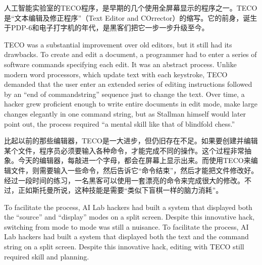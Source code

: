 \ifdefined\chs
人工智能实验室的TECO程序，是早期的几个使用全屏幕显示的程序之一。TECO是``文本编辑及修正程序''（Text Editor and COrrector）的缩写。它的前身，诞生于PDP-6和电子打字机的年代，是黑客们把它一步一步升级至今。
\fi

\ifdefined\eng
TECO was a substantial improvement over old editors, but it still had its drawbacks. To create and edit a document, a programmer had to enter a series of \ifdefined\vone software \fi commands specifying each edit. It was an abstract process. Unlike modern word processors, which update text with each keystroke, TECO demanded that the user enter an extended series of editing instructions followed by an ``end of command\ifdefined\vtwo string\fi'' sequence just to change the text. Over time, a hacker grew proficient enough to \ifdefined\vone write entire documents in edit mode, \fi\ifdefined\vtwo make large changes elegantly in one command string, \fi but as Stallman himself would later point out, the process required ``a mental skill like that of blindfold chess.''
\fi

\ifdefined\chs
比起以前的那些编辑器，TECO是一大进步，但仍旧存在不足。如果要创建并编辑某个文件，程序员必须要输入各种命令，才能完成不同的操作。这个过程非常抽象。今天的编辑器，每敲进一个字母，都会在屏幕上显示出来。而使用TECO来编辑文件，则需要输入一些命令，然后告诉它``命令结束''，然后才能把文件修改好。经过一段时间的练习，一名黑客可以使用一套漂亮的命令来完成很大的修改。不过，正如斯托曼所说，这种技能是需要``类似下盲棋一样的脑力消耗''。
\fi

\ifdefined\eng
\ifdefined\vone
To facilitate the process, AI Lab hackers had built a system that displayed both the ``source'' and ``display'' modes on a split screen. Despite this innovative hack, switching from mode to mode was still a nuisance.
\fi
\ifdefined\vtwo
To facilitate the process, AI Lab hackers had built a system that displayed both the text and the command string on a split screen. Despite this innovative hack, editing with TECO still required skill and planning.
\fi
\fi

